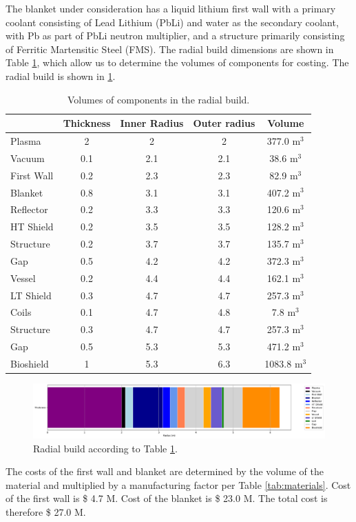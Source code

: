 The blanket under consideration has a liquid lithium first wall with a primary coolant consisting of Lead Lithium (PbLi) and water as the secondary coolant, with Pb as part of PbLi neutron multiplier, and a structure primarily consisting of Ferritic Martensitic Steel (FMS). The radial build dimensions are shown in Table \ref{tab:volumes}, which allow us to determine the volumes of components for costing.  The radial build is shown in \ref{fig:radial}.  \\


\begin{table}[h!]
    \centering
    \begin{tabular}{l c  c c c}
    \hline
        &	Thickness	&	Inner Radius	&	Outer radius	&	Volume		\\
        \hline
Plasma	&	2	&	2	&	2	&	377.0	m$^{3}$	\\
Vacuum	&	0.1	&	2.1	&	2.1	&	38.6	m$^{3}$	\\
First Wall	&	0.2	&	2.3	&	2.3	&	82.9	m$^{3}$	\\
Blanket	&	0.8	&	3.1	&	3.1	&	407.2	m$^{3}$	\\
Reflector	&	0.2	&	3.3	&	3.3	&	120.6	m$^{3}$	\\
HT Shield	&	0.2	&	3.5	&	3.5	&	128.2	m$^{3}$	\\
Structure	&	0.2	&	3.7	&	3.7	&	135.7	m$^{3}$	\\
Gap	&	0.5	&	4.2	&	4.2	&	372.3	m$^{3}$	\\
Vessel	&	0.2	&	4.4	&	4.4	&	162.1	m$^{3}$	\\
LT Shield	&	0.3	&	4.7	&	4.7	&	257.3	m$^{3}$	\\
Coils	&	0.1	&	4.7	&	4.8	&	7.8	m$^{3}$	\\
Structure	&	0.3	&	4.7	&	4.7	&	257.3	m$^{3}$	\\
Gap	&	0.5	&	5.3	&	5.3	&	471.2	m$^{3}$	\\
Bioshield	&	1	&	5.3	&	6.3	&	1083.8	m$^{3}$	\\

        \hline
    \end{tabular}
    \caption{Volumes of components in the radial build.}
    \label{tab:volumes}
\end{table}

\begin{figure}
    \centering
    \includegraphics[width=0.9\linewidth]{Figures/radial_build.pdf}
    \caption{Radial build according to Table \ref{tab:volumes}.}
    \label{fig:radial}
\end{figure}



The costs of the first wall and blanket are determined by the volume of the material and multiplied by a manufacturing factor per Table \ref{tab:materials}.   Cost of the first wall is \$ 4.7 M.  Cost of the blanket is \$ 23.0 M. The total cost is therefore \$ 27.0 M.

